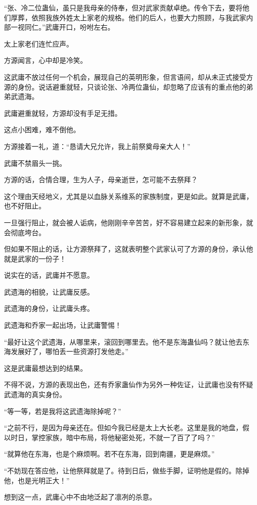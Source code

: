 \begin{this_body}
“张、冷二位蛊仙，虽只是我母亲的侍奉，但对武家贡献卓绝。传令下去，要将他们厚葬，依照我族外姓太上家老的规格。他们的后人，也要大力照顾，与我武家内部一视同仁。”武庸开口，吩咐左右。

太上家老们连忙应声。

方源闻言，心中却是冷笑。

这武庸不放过任何一个机会，展现自己的英明形象，但言语间，却从未正式接受方源的身份。说话避重就轻，只谈论张、冷两位蛊仙，却忽略了应该有的重点他的弟弟武遗海。

武庸避重就轻，方源却没有手足无措。

这点小困难，难不倒他。

方源接着一礼，道：“恳请大兄允许，我上前祭奠母亲大人！”

武庸不禁眉头一挑。

方源的话，合情合理，生为人子，母亲逝世，怎可能不去祭拜？

这个理由天经地义，尤其是以血脉关系维系的家族制度，更是如此。就算是武庸，也不好阻止。

一旦强行阻止，就会被人诟病，他刚刚辛辛苦苦，好不容易建立起来的新形象，就会彻底垮台。

但如果不阻止的话，让方源祭拜了，这就表明整个武家认可了方源的身份，承认他就是武家的一份子！

说实在的话，武庸并不愿意。

武遗海的相貌，让武庸反感。

武遗海的身份，让武庸头疼。

武遗海和乔家一起出场，让武庸警惕！

“最好让这个武遗海，从哪里来，滚回到哪里去。他不是东海蛊仙吗？就让他去东海发展好了，哪怕丢一些资源打发他走。”

这是武庸最想达到的结果。

不得不说，方源的表现出色，还有乔家蛊仙作为另外一种佐证，让武庸也没有怀疑武遗海的真实身份。

“等一等，若是我将这武遗海除掉呢？”

“之前不行，是因为母亲还在。但如今我已经是太上大长老。这里是我的地盘，假以时日，掌控家族，暗中布局，将他秘密处死，不就一了百了了吗？”

“就算他在东海，也是个麻烦啊。若不在东海，回到南疆，更是麻烦。”

“不妨现在答应他，让他祭拜就是了。待到日后，做些手脚，证明他是假的。除掉他，也是光明正大！”

想到这一点，武庸心中不由地泛起了凛冽的杀意。


\end{this_body}
